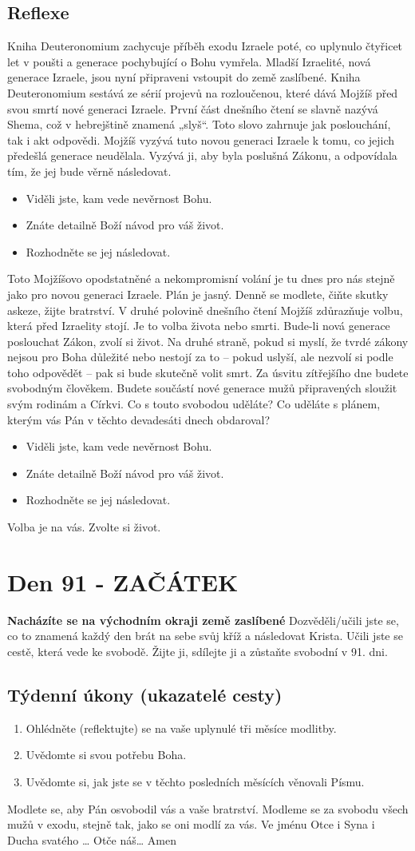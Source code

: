 \documentclass[11pt]{article}
\newcommand{\zacatekTrinactyTyden}{
\textbf{Nacházíte se na východním okraji země zaslíbené} \newline 
Dozvěděli/učili jste se, co to znamená každý den brát na sebe svůj kříž a následovat Krista. Učili jste se cestě, která vede ke svobodě. Žijte ji, sdílejte ji a zůstaňte svobodní v 91. dni.

\subsection*{Týdenní úkony (ukazatelé cesty)}
\begin{enumerate}
  \item Ohlédněte (reflektujte) se na vaše uplynulé tři měsíce modlitby.
  \item Uvědomte si svou potřebu Boha.
  \item Uvědomte si, jak jste se v těchto posledních měsících věnovali Písmu.
\end{enumerate}
Modlete se, aby Pán osvobodil vás a vaše bratrství. \newline
Modleme se za svobodu všech mužů v exodu, stejně tak, jako se oni modlí za vás.\newline
Ve jménu Otce i Syna i Ducha svatého …  Otče náš… Amen
}
\begin{document}
\subsection*{Reflexe}
Kniha Deuteronomium zachycuje příběh exodu Izraele poté, co uplynulo čtyřicet let v poušti a generace
pochybující o Bohu vymřela. Mladší Izraelité, nová generace Izraele, jsou nyní připraveni vstoupit do země
zaslíbené. Kniha Deuteronomium sestává ze sérií projevů na rozloučenou, které dává Mojžíš před svou smrtí
nové generaci Izraele.
První část dnešního čtení se slavně nazývá Shema, což v hebrejštině znamená „slyš“. Toto slovo zahrnuje jak
poslouchání, tak i akt odpovědi. Mojžíš vyzývá tuto novou generaci Izraele k tomu, co jejich předešlá
generace neudělala. Vyzývá ji, aby byla poslušná Zákonu, a odpovídala tím, že jej bude věrně následovat.
\begin{itemize}
  \item Viděli jste, kam vede nevěrnost Bohu.
  \item Znáte detailně Boží návod pro váš život.
  \item Rozhodněte se jej následovat.
\end{itemize}

Toto Mojžíšovo opodstatněné a nekompromisní volání je tu dnes pro nás stejně jako pro novou generaci
Izraele. Plán je jasný. Denně se modlete, čiňte skutky askeze, žijte bratrství.
V druhé polovině dnešního čtení Mojžíš zdůrazňuje volbu, která před Izraelity stojí. Je to volba života nebo
smrti. Bude-li nová generace poslouchat Zákon, zvolí si život. Na druhé straně, pokud si myslí, že tvrdé
zákony nejsou pro Boha důležité nebo nestojí za to – pokud uslyší, ale nezvolí si podle toho odpovědět – pak
si bude skutečně volit smrt.
Za úsvitu zítřejšího dne budete svobodným člověkem. Budete součástí nové generace mužů připravených
sloužit svým rodinám a Církvi. Co s touto svobodou uděláte? Co uděláte s plánem, kterým vás Pán v těchto
devadesáti dnech obdaroval?
\begin{itemize}
  \item Viděli jste, kam vede nevěrnost Bohu.
  \item Znáte detailně Boží návod pro váš život.
  \item Rozhodněte se jej následovat.
\end{itemize}
Volba je na vás. Zvolte si život.


\newpage
\section{Den 91 - ZAČÁTEK}
\zacatekTrinactyTyden
\end{document}
